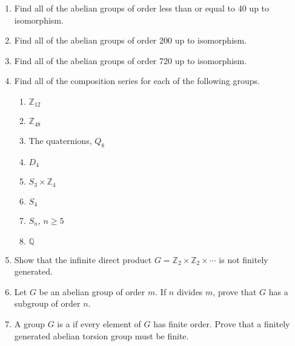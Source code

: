 {\small
\begin{enumerate}
 
\item
Find all of the abelian groups of order less than or equal to 40 up to
isomorphism.
 
\item
Find all of the abelian groups of order 200 up to isomorphism.
 
\item
Find all of the abelian groups of order 720 up to isomorphism.
 
\item
Find all of the composition series for each of the following groups.
\begin{multicols}{2}
\begin{enumerate}

\item
${\mathbb Z}_{12}$

\item
${\mathbb Z}_{48}$

\item
The quaternions, $Q_8$

\item
$D_4$

\item
$S_3 \times {\mathbb Z}_4$

\item
$S_4$

\item
$S_n$, $n \geq 5$

\item
${\mathbb Q}$


\end{enumerate}
\end{multicols}
 
 
 
 
\item  %
Show that the infinite direct product $G = {\mathbb Z}_2 \times {\mathbb
Z}_2 \times \cdots$ is not finitely generated.
 
 
 
\item
Let $G$ be an abelian group of order $m$.  If $n$ divides $m$, prove
that $G$ has a subgroup of order $n$.
 
\item
A group $G$ is a  if every 
element of $G$ has finite order.  Prove that a finitely generated abelian
torsion group must be finite.
 

\end{enumerate}}
